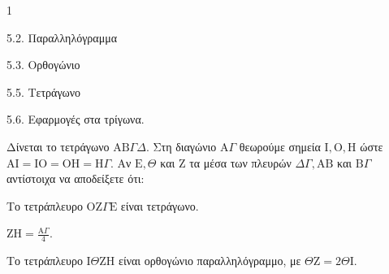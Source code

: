 \begin{ylh}{1}
    \item 5.2. Παραλληλόγραμμα
    \item 5.3. Ορθογώνιο
    \item 5.5. Τετράγωνο
    \item 5.6. Εφαρμογές στα τρίγωνα.
\end{ylh}
Δίνεται το τετράγωνο $\mathrm{A}\mathrm{B}\Gamma\Delta$. Στη διαγώνιο $\mathrm{A}\Gamma$ θεωρούμε σημεία $\mathrm{I}, \mathrm{O}, \mathrm{H}$ ώστε $\mathrm{A}\mathrm{I} = \mathrm{I}\mathrm{O} = \mathrm{O}\mathrm{H} = \mathrm{H}\Gamma$. Αν $\mathrm{E}, \Theta$ και $\mathrm{Z}$ τα μέσα των πλευρών $\Delta\Gamma, \mathrm{A}\mathrm{B}$ και $\mathrm{B}\Gamma$ αντίστοιχα να αποδείξετε ότι:
\begin{alist}
    \item Το τετράπλευρο $\mathrm{O}\mathrm{Z}\Gamma\mathrm{E}$ είναι τετράγωνο. 
    \item $\mathrm{Z}\mathrm{H} = \frac{\mathrm{A}\Gamma}{4}$. 
    \item Το τετράπλευρο $\mathrm{I}\Theta\mathrm{Z}\mathrm{H}$ είναι ορθογώνιο παραλληλόγραμμο, με $\Theta\mathrm{Z} = 2\Theta\mathrm{I}$. 
\end{alist}
